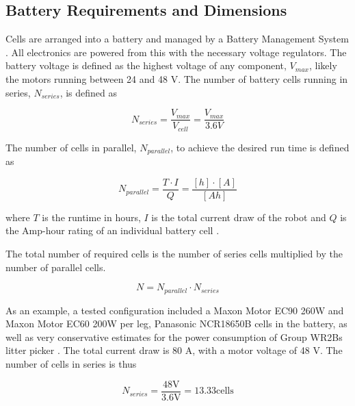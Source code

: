 \subsection{Battery Requirements and Dimensions}

Cells are arranged into a battery and managed by a Battery Management System \cite{voltaplex_6s16s_nodate}. All electronics are powered from this with the necessary voltage regulators.
The battery voltage is defined as the highest voltage of any component, $V_{max}$, likely the motors running between 24 and 48 V.
The number of battery cells running in series, $N_{series}$, is defined as

\begin{equation}
    N_{series} = \frac{V_{max}}{V_{cell}} = \frac{V_{max}}{3.6 V}
\end{equation}

The number of cells in parallel, $N_{parallel}$, to achieve the desired run time is defined as

\begin{equation}
    N_{parallel} = \frac{T \cdot I}{Q} = \frac{[h] \cdot [A]}{[Ah]}
\end{equation}

where $T$ is the runtime in hours, $I$ is the total current draw of the robot and $Q$ is the Amp-hour rating of an individual battery cell \cite{digikey_electronics_battery_nodate}.

The total number of required cells is the number of series cells multiplied by the number of parallel cells.

\begin{equation}
    N = N_{parallel} \cdot N_{series}
\end{equation}

As an example, a tested configuration included a Maxon Motor EC90 260W and Maxon Motor EC60 200W per leg, Panasonic NCR18650B cells in the battery, as well as very conservative estimates for the power consumption of Group WR2Bs litter picker \cite{maxon_motor_ec60_nodate} \cite{harmonic_drive_csd-2a_nodate} \cite{panasonic_industrial_devices_specifications_nodate} \cite{18650batterystore_18650_nodate}.
The total current draw is 80 A, with a motor voltage of 48 V.
The number of cells in series is thus

\begin{equation}
    N_{series} = \frac{48 \text{V}}{3.6 \text{V}} = 13.33 \text{cells}
\end{equation}

